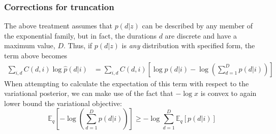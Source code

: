 \documentclass[11pt]{article}
\begin{document}
\subsubsection{Corrections for truncation}
The above treatment assumes that $p(d|z)$ can be described by any member of the exponential family, but in fact, the durations $d$ are discrete and have a maximum value, $D$. Thus, if $p(d|z)$ is \emph{any} distribution with specified form, the term above becomes
\begin{align}
    \sum_{i, d} C(d, i) \log \hat{p}(d|i) &= \sum_{i, d} C(d, i) \left[
    \log p(d|i) - \log \left(\sum_{d=1}^D p(d|i) \right)
    \right]
\end{align}
When attempting to calculate the expectation of this term with respect to the variational posterior, we can make use of the fact that $-\log x$ is convex to again lower bound the variational objective:
\begin{equation}
    \mathbb{E}_q\left[-\log \left(\sum_{d=1}^D p(d|i) \right)\right] \ge
    -\log \sum_{d=1}^D \mathbb{E}_q\left[ p(d|i) \right]
\end{equation}
\end{document}
